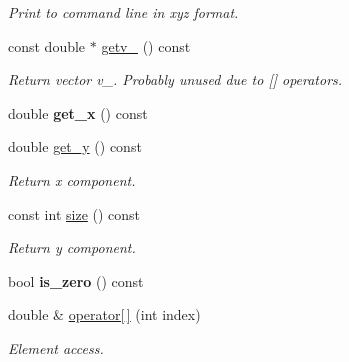 \begin{DoxyCompactItemize}
\begin{DoxyCompactList}\small\item\em Print to command line in xyz format. \end{DoxyCompactList}\item 
\mbox{\label{classtopology_1_1Vector2d_a71afcc108ac679d3187a362d8f83ee9f}} 
const double $\ast$ \mbox{\hyperlink{classtopology_1_1Vector2d_a71afcc108ac679d3187a362d8f83ee9f}{getv\+\_\+}} () const
\begin{DoxyCompactList}\small\item\em Return vector v\+\_\+. Probably unused due to \mbox{[}\mbox{]} operators. \end{DoxyCompactList}\item 
\mbox{\label{classtopology_1_1Vector2d_ad601cbedb3fb038966d82c9a9fa0811a}} 
double {\bfseries get\+\_\+x} () const
\item 
\mbox{\label{classtopology_1_1Vector2d_af01fdaa040a15d7643f9088d9b3755a2}} 
double \mbox{\hyperlink{classtopology_1_1Vector2d_af01fdaa040a15d7643f9088d9b3755a2}{get\+\_\+y}} () const
\begin{DoxyCompactList}\small\item\em Return x component. \end{DoxyCompactList}\item 
const int \mbox{\hyperlink{classtopology_1_1Vector2d_a81f9259cef101add1652394d8aea044c}{size}} () const
\begin{DoxyCompactList}\small\item\em Return y component. \end{DoxyCompactList}\item 
\mbox{\label{classtopology_1_1Vector2d_a096846877b61869091ec646ecbca856d}} 
bool {\bfseries is\+\_\+zero} () const
\item 
\mbox{\label{classtopology_1_1Vector2d_a99d4c796f7d8787c46f3af09bdb69778}} 
double \& \mbox{\hyperlink{classtopology_1_1Vector2d_a99d4c796f7d8787c46f3af09bdb69778}{operator\mbox{[}$\,$\mbox{]}}} (int index)
\begin{DoxyCompactList}\small\item\em Element access. \end{DoxyCompactList}\item 

\end{DoxyCompactItemize}
